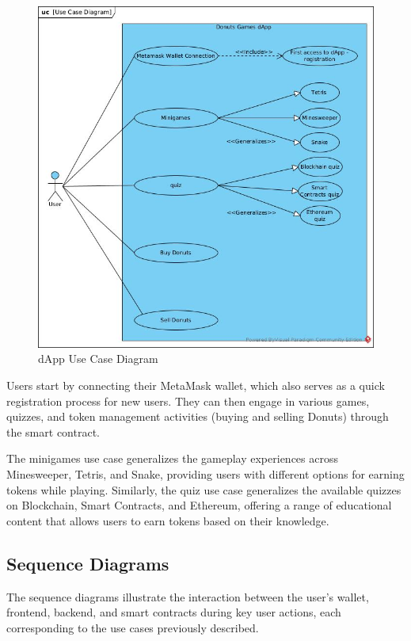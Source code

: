 \documentclass[../main.tex]{subfiles}
\begin{document}
\begin{figure}[H]
    \centering
    \includegraphics[width=\linewidth]{../src/diagrams/Use Case Diagram.jpg}
    \caption{dApp Use Case Diagram}
    \label{fig:useCaseDiag}
\end{figure}

Users start by connecting their MetaMask wallet, which also serves as a quick registration process for new users. They can then engage in various games, quizzes, and token management activities (buying and selling Donuts) through the smart contract.

The minigames use case generalizes the gameplay experiences across Minesweeper, Tetris, and Snake, providing users with different options for earning tokens while playing. Similarly, the quiz use case generalizes the available quizzes on Blockchain, Smart Contracts, and Ethereum, offering a range of educational content that allows users to earn tokens based on their knowledge.


\subsection{Sequence Diagrams}
The sequence diagrams illustrate the interaction between the user's wallet, frontend, backend, and smart contracts during key user actions, each corresponding to the use cases previously described.
\end{document}
